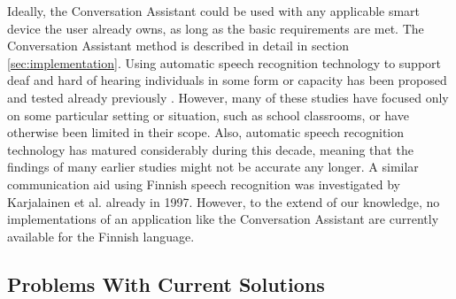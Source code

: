 \documentclass[english, 12pt, a4paper, pdftex, elec, utf8]{aaltothesis}
\begin{document}
Ideally, the Conversation Assistant could be used with any applicable smart device the user already owns, as long as the basic requirements are met. The Conversation Assistant method is described in detail in section \ref{sec:implementation}. Using automatic speech recognition technology to support deaf and hard of hearing individuals in some form or capacity has been proposed and tested already previously \cite{robison1996computer, kheir2007inclusion, mirzaei2012combining}. However, many of these studies have focused only on some particular setting or situation, such as school classrooms, or have otherwise been limited in their scope. Also, automatic speech recognition technology has matured considerably during this decade, meaning that the findings of many earlier studies might not be accurate any longer. A similar communication aid using Finnish speech recognition was investigated by Karjalainen et al. already in 1997. However, to the extend of our knowledge, no implementations of an application like the Conversation Assistant are currently available for the Finnish language.

\subsection{Problems With Current Solutions}
\end{document}
